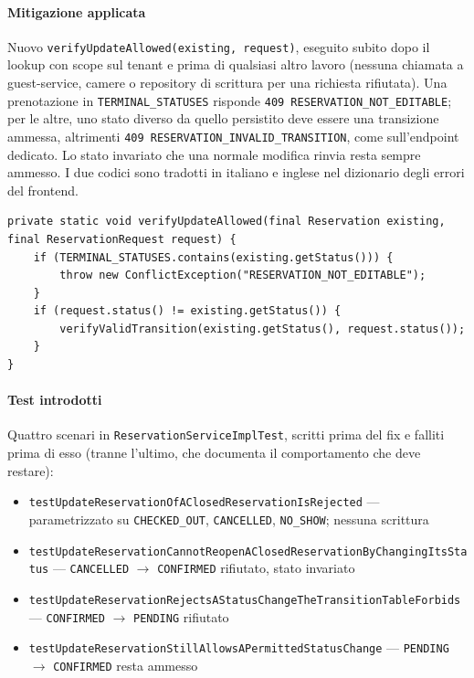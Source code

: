 ﻿\documentclass[a4paper,12pt]{report}
\begin{document}
\paragraph{Mitigazione applicata}
Nuovo \texttt{verifyUpdateAllowed(existing, request)}, eseguito subito dopo il lookup con
scope sul tenant e prima di qualsiasi altro lavoro (nessuna chiamata a guest-service, camere
o repository di scrittura per una richiesta rifiutata). Una prenotazione in
\texttt{TERMINAL\_STATUSES} risponde \texttt{409 RESERVATION\_NOT\_EDITABLE}; per le altre,
uno stato diverso da quello persistito deve essere una transizione ammessa, altrimenti
\texttt{409 RESERVATION\_INVALID\_TRANSITION}, come sull'endpoint dedicato. Lo stato
invariato che una normale modifica rinvia resta sempre ammesso. I due codici sono tradotti in
italiano e inglese nel dizionario degli errori del frontend.

\begin{securebox}[title={ReservationServiceImpl.java --- guard su stato chiuso e transizioni (fix)}]
\begin{lstlisting}[style=java]
private static void verifyUpdateAllowed(final Reservation existing, final ReservationRequest request) {
    if (TERMINAL_STATUSES.contains(existing.getStatus())) {
        throw new ConflictException("RESERVATION_NOT_EDITABLE");
    }
    if (request.status() != existing.getStatus()) {
        verifyValidTransition(existing.getStatus(), request.status());
    }
}
\end{lstlisting}
\end{securebox}

\paragraph{Test introdotti}
Quattro scenari in \texttt{ReservationServiceImplTest}, scritti prima del fix e falliti prima
di esso (tranne l'ultimo, che documenta il comportamento che deve restare):
\begin{itemize}
  \item \texttt{testUpdateReservationOfAClosedReservationIsRejected} --- parametrizzato su
        \texttt{CHECKED\_OUT}, \texttt{CANCELLED}, \texttt{NO\_SHOW}; nessuna scrittura
  \item \texttt{testUpdateReservationCannotReopenAClosedReservationByChangingItsStatus} ---
        \texttt{CANCELLED} $\to$ \texttt{CONFIRMED} rifiutato, stato invariato
  \item \texttt{testUpdateReservationRejectsAStatusChangeTheTransitionTableForbids} ---
        \texttt{CONFIRMED} $\to$ \texttt{PENDING} rifiutato
  \item \texttt{testUpdateReservationStillAllowsAPermittedStatusChange} --- \texttt{PENDING}
        $\to$ \texttt{CONFIRMED} resta ammesso
\end{itemize}
\end{document}
